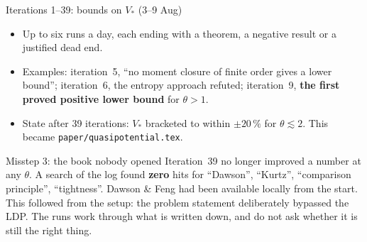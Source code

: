\documentclass[11pt,aspectratio=169]{beamer}
\newcommand{\datei}[1]{\texttt{#1}}
\begin{document}
\begin{frame}{Iterations 1--39: bounds on $V_\ast$ (3--9 Aug)}
  \begin{itemize}
  \setlength\itemsep{3pt}
  \item Up to six runs a day, each ending with a theorem, a negative result or a
    justified dead end.
  \item Examples: iteration~5, \enquote{no moment closure of finite order gives a lower
    bound}; iteration~6, the entropy approach refuted; iteration~9, \textbf{the first
    proved positive lower bound} for $\theta>1$.
  \item State after 39 iterations: $V_\ast$ bracketed to within $\pm20\,\%$ for
    $\theta\lesssim2$. This became \datei{paper/quasipotential.tex}.
  \end{itemize}
  \begin{block}{Misstep 3: the book nobody opened}
    \footnotesize
    Iteration~39 no longer improved a number at any $\theta$. A search of the log found
    \textbf{zero} hits for \enquote{Dawson}, \enquote{Kurtz},
    \enquote{comparison principle}, \enquote{tightness}. Dawson \& Feng had been available
    locally from the start. This followed from the setup: the problem statement
    deliberately bypassed the LDP. The runs work through what is written down, and do not
    ask whether it is still the right thing.
  \end{block}
\end{frame}
\end{document}
